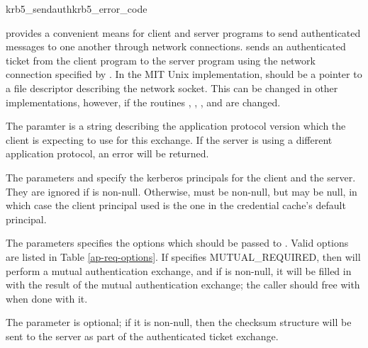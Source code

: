 \begin{funcdecl}{krb5_sendauth}{krb5_error_code}
\funcin
{}
\funcinout
{}
\funcout
{}
\end{funcdecl}

 provides a convenient means for client and
server programs to send authenticated messages to one another through
network connections.   sends an authenticated
ticket from the client program to the server program using the network
connection specified by .  In the MIT Unix implementation,
 should be a pointer to a file descriptor describing the
network socket.  This can be changed in other implementations, however,
if the routines ,
, , and
 are changed.

The paramter  is a string describing the
application protocol version which the client is expecting to use for
this exchange.  If the server is using a different application protocol,
an error will be returned.

The parameters  and  specify the
kerberos principals for the client and the server.  They are
ignored if  is non-null.  Otherwise,
 must be non-null, but  may be
null, in which case the client principal used is the one in the
credential cache's default principal.

The  parameters specifies the options which
should be passed to .  Valid options are listed
in Table \ref{ap-req-options}.  If 
specifies MUTUAL_REQUIRED, then  will perform
a mutual authentication exchange, and if  is
non-null, it will be filled in with the result of the mutual
authentication exchange; the caller should free
 with
 when done with it.

The  parameter is optional; if it is non-null,
then the checksum structure will be sent to the server as part of the
authenticated ticket exchange.

